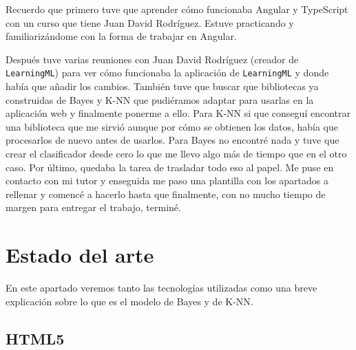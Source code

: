 \documentclass[a4paper, 12pt]{book}
\begin{document}
Recuerdo que primero tuve que aprender cómo funcionaba Angular y TypeScript con un curso que tiene Juan David Rodríguez. Estuve practicando y familiarizándome con la forma de trabajar en Angular.

Después tuve varias reuniones con Juan David Rodríguez (creador de \texttt{LearningML}) para ver cómo funcionaba la aplicación de \texttt{LearningML} y donde había que añadir los cambios.
También tuve que buscar que bibliotecas ya construidas de Bayes y K-NN que pudiéramos adaptar para usarlas en la aplicación web y finalmente ponerme a ello. Para K-NN si que conseguí encontrar una biblioteca que me sirvió aunque por cómo se obtienen los datos, había que procesarlos de nuevo antes de usarlos. Para Bayes no encontré nada y tuve que crear el clasificador desde cero lo que me llevo algo más de tiempo que en el otro caso.
Por último, quedaba la tarea de trasladar todo eso al papel. Me puse en contacto con mi tutor y enseguida me paso una plantilla con los apartados a rellenar y comencé a hacerlo hasta que finalmente, con no mucho tiempo de margen para entregar el trabajo, terminé.



\cleardoublepage
\chapter{Estado del arte}
\label{chap:estado}

En este apartado veremos tanto las tecnologías utilizadas como una breve explicación sobre lo que es el modelo de Bayes y de K-NN.

\section{HTML5} 
\label{sec:html5}
\end{document}
